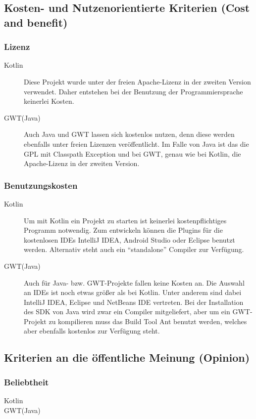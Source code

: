 \subsection{Kosten- und Nutzenorientierte Kriterien (Cost and benefit)}
\subsubsection{Lizenz}
\begin{description}
	\item[Kotlin] Diese Projekt wurde unter der freien Apache-Lizenz in der zweiten Version verwendet. Daher entstehen bei der Benutzung der Programmiersprache keinerlei Kosten. \cite{kotlinFree}
	\item[GWT(Java)] Auch Java und \gls{GWT} lassen sich kostenlos nutzen, denn diese werden ebenfalls unter freien Lizenzen veröffentlicht. Im Falle von Java ist das die \gls{GPL} mit Classpath Exception und bei \gls{GWT}, genau wie bei Kotlin, die Apache-Lizenz in der zweiten Version. \cite{javaLicense, gwtTerms}
\end{description}

\subsubsection{Benutzungskosten}
\begin{description}
	\item[Kotlin] Um mit Kotlin ein Projekt zu starten ist keinerlei kostenpflichtiges Programm notwendig. Zum entwickeln können die Plugins für die kostenlosen \glspl{IDE} IntelliJ IDEA, Android Studio oder Eclipse benutzt werden. Alternativ steht auch ein \enquote{standalone} Compiler zur Verfügung.
	\item[GWT(Java)] Auch für Java- bzw. \gls{GWT}-Projekte fallen keine Kosten an. Die Auswahl an \glspl{IDE} ist noch etwas größer als bei Kotlin. Unter anderem sind dabei IntelliJ IDEA, Eclipse und NetBeans IDE vertreten. Bei der Installation des \gls{SDK} von Java wird zwar ein Compiler mitgeliefert, aber um ein \gls{GWT}-Projekt zu kompilieren muss das Build Tool Ant benutzt werden, welches aber ebenfalls kostenlos zur Verfügung steht.
\end{description}


\subsection{Kriterien an die öffentliche Meinung (Opinion)}
\subsubsection{Beliebtheit}
\begin{description}
	\item[Kotlin] 
	\item[GWT(Java)] 
\end{description}

